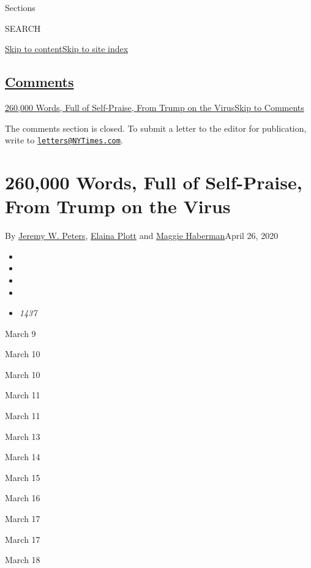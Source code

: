 Sections

SEARCH

\protect\hyperlink{site-content}{Skip to
content}\protect\hyperlink{site-index}{Skip to site index}

\hypertarget{comments}{%
\subsection{\texorpdfstring{\protect\hyperlink{commentsContainer}{Comments}}{Comments}}\label{comments}}

\href{}{260,000 Words, Full of Self-Praise, From Trump on the
Virus}\href{}{Skip to Comments}

The comments section is closed. To submit a letter to the editor for
publication, write to
\href{mailto:letters@NYTimes.com}{\nolinkurl{letters@NYTimes.com}}.

\hypertarget{260000-words-full-of-self-praise-from-trump-on-the-virus}{%
\section{260,000 Words, Full of Self-Praise, From Trump on the
Virus}\label{260000-words-full-of-self-praise-from-trump-on-the-virus}}

By \href{https://www.nytimes3xbfgragh.onion/by/jeremy-w-peters}{Jeremy
W. Peters},
\href{https://www.nytimes3xbfgragh.onion/by/elaina-plott}{Elaina Plott}
and \href{https://www.nytimes3xbfgragh.onion/by/maggie-haberman}{Maggie
Haberman}April 26, 2020

\begin{itemize}
\item
\item
\item
\item
\item
  \emph{1437}
\end{itemize}

March 9

March 10

March 10

March 11

March 11

March 13

March 14

March 15

March 16

March 17

March 17

March 18

